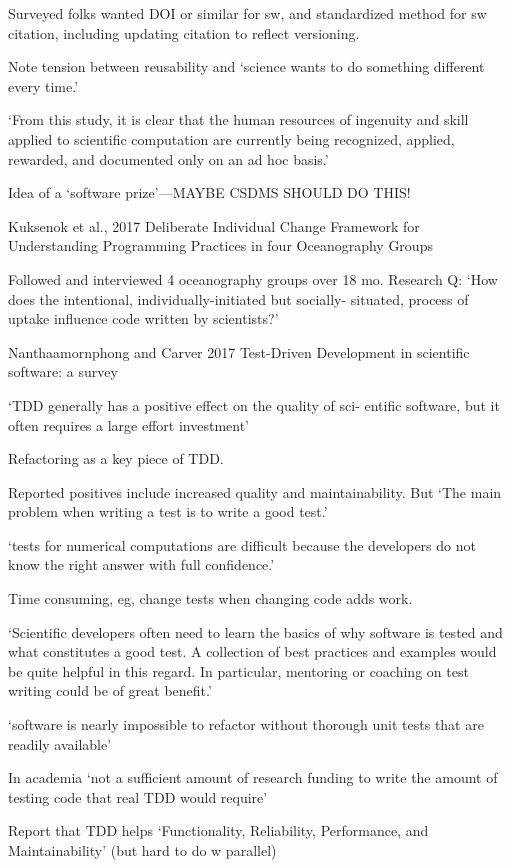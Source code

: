 \documentclass[12pt]{amsart}
\begin{document}
Surveyed folks wanted DOI or similar for sw, and standardized method for sw citation, including updating citation to reflect versioning.

Note tension between reusability and `science wants to do something different every time.'

`From this study, it is clear that the human resources of ingenuity and skill applied to scientific computation are currently being recognized, applied, rewarded, and documented only on an ad hoc basis.'

Idea of a `software prize'---MAYBE CSDMS SHOULD DO THIS!


Kuksenok et al., 2017 Deliberate Individual Change Framework for Understanding Programming Practices in four Oceanography Groups

Followed and interviewed 4 oceanography groups over 18 mo. Research Q: `How does the intentional, individually-initiated but socially- situated, process of uptake influence code written by scientists?'




Nanthaamornphong and Carver 2017 Test-Driven Development in scientific software: a survey

`TDD generally has a positive effect on the quality of sci- entific software, but it often requires a large effort investment'

Refactoring as a key piece of TDD. 

Reported positives include increased quality and maintainability.  But `The main problem when writing a test is to write a good test.'

`tests for numerical computations are difficult because the developers do not know the right answer with full confidence.'

Time consuming, eg, change tests when changing code adds work.

`Scientific developers often need to learn the basics of why software is tested and what constitutes a good test. A collection of best practices and examples would be quite helpful in this regard. In particular, mentoring or coaching on test writing could be of great benefit.'

`software is nearly impossible to refactor without thorough unit tests that are readily available'

In academia `not a sufficient amount of research funding to write the amount of testing code that real TDD would require'

Report that TDD helps `Functionality, Reliability, Performance, and Maintainability' (but hard to do w parallel)
\end{document}
